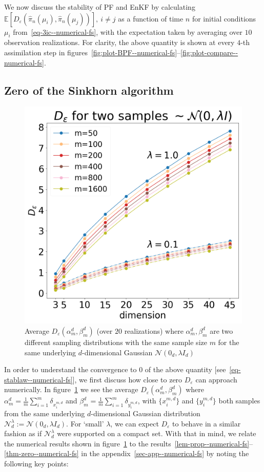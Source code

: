 
We now discuss the stability of PF and EnKF by calculating $\mathbb E[D_\varepsilon(\hat\pi_n(\mu_i), \hat\pi_n(\mu_j))], \ i \ne j$ as a function of time $n$ for initial conditions $\mu_i$ from~\eqref{eq-3ic--numerical-fs}, with the expectation taken by
averaging over $10$ observation realizations. For clarity, the above quantity is shown at every $4$-th assimilation step in figures~\ref{fig:plot-BPF--numerical-fs}--\ref{fig:plot-compare--numerical-fs}.

\subsection{Zero of the Sinkhorn algorithm}
\begin{figure}
\centering
\includegraphics[width=0.8\columnwidth]{numerical-fs/plots/figures-EnKF-zeros_cov=0.1_cov=1.0.png}
\caption{Average $D_{\varepsilon}(\alpha_m^d, \beta_m^d)$ (over $20$ realizations) where $\alpha_m^d, \beta_m^d$ are two different sampling distributions with the same sample size $m$ for the same underlying $d$-dimensional Gaussian $\mathcal N(0_d, \lambda I_d)$}
\label{fig:plot-zeros--numerical-fs}
\end{figure}
In order to understand the convergence to $0$ of the above quantity [see~\eqref{eq-stablaw--numerical-fs}], we first discuss how close to zero $D_\varepsilon$ can approach numerically. In figure~\ref{fig:plot-zeros--numerical-fs} we see the average $D_\varepsilon(\alpha^d_m, \beta^d_m)$ where $\alpha_m^d=\frac{1}{m}\sum_{i=1}^m\delta_{x^{m,d}_i}$ and $\beta_m^d=\frac{1}{m}\sum_{i=1}^m\delta_{y^{m,d}_i}$, with $\{x^{m,d}_i\}$ and $\{y^{m,d}_i\}$ both samples from the same underlying $d$-dimensional Gaussian distribution $\mathcal N_d^\lambda:=\mathcal N(0_d, \lambda I_d)$. 
For `small' $\lambda$, we can expect $D_\varepsilon$ to behave in a similar fashion as if $\mathcal N_d^\lambda$ were supported on a compact set. With that in mind, we relate the numerical results shown in figure~\ref{fig:plot-zeros--numerical-fs} to the results~\ref{lem-prop--numerical-fs}--\ref{thm-zero--numerical-fs} in the appendix~\ref{sec-app--numerical-fs} by noting the following key points:

